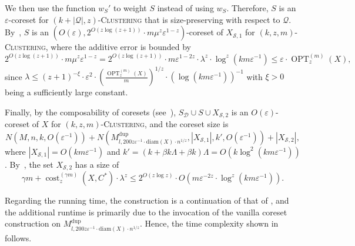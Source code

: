 \documentclass[letterpaper,11pt]{article}
\theoremstyle{plain}
\theoremstyle{definition}
\theoremstyle{remark}
\DeclareMathOperator{\cost}{cost}
\DeclareMathOperator{\OPT}{OPT}
\newcommand{\diam}{\mathrm{diam}}
\newcommand{\dup}{\mathrm{dup}}
\newcommand{\eps}{\varepsilon}
\newcommand{\calD}{\mathcal{D}}
\newcommand{\calQ}{\mathcal{Q}}
\newcommand{\calS}{\mathcal{S}}
\newcommand{\ProblemName}[1]{\textsc{#1}}
\newcommand{\tzC}[1]{\ProblemName{$(#1,z)$-Clustering}\xspace}
\newcommand{\kzmC}{\ProblemName{$(k,z,m)$-Clustering}\xspace}
\begin{document}
We then use the function $w_S'$ to weight $S$ instead of using $w_S$. Therefore, $S$ is an $\eps$-coreset for \tzC{k+|\calQ|} that is size-preserving with respect to $\calQ$.
By~, $S$ is an $\left(O(\eps), 2^{O(z\log (z+1))}\cdot m\mu^z\eps^{1-z}\right)$-coreset of $X_{\calS,1}$ for \kzmC, where the additive error is bounded by 
\begin{equation*}
    2^{O(z\log (z+1))}\cdot m\mu^z\eps^{1-z} = 2^{O(z\log(z+1))}\cdot m\eps^{1-2z}\cdot
    \lambda^z\cdot \log^z(km\eps^{-1})\le \eps\cdot \OPT_z^{(m)}(X),
\end{equation*}
since $\lambda \le (z+1)^{-\xi}\cdot \eps^{2}\cdot \left(\frac{ \OPT_z^{(m)}(X)}{m} \right)^{1/z}\cdot \left(\log(km\eps^{-1})\right)^{-1}$ with $\xi > 0$ being a sufficiently large constant.

Finally, by the composability of coresets (see~), $S_{\calD}\cup S\cup X_{\calS,2}$ is an $O(\eps)$-coreset of $X$ for \kzmC, and the coreset size is 
\begin{equation*}
    N(M,n,k,O(\eps^{-1})) + N\left(M^\dup_{l,200z\eps^{-1}\cdot \diam(X)\cdot n^{1/z}}, |X_{\calS,1}|, k', O(\eps^{-1})\right) + |X_{\calS,2}|,
\end{equation*}
where $|X_{\calS,1}| = O(km\eps^{-1})$ and $k'=(k+\beta k\Lambda + \beta k)\Lambda = O(k\log^2(km\eps^{-1}))$.
By~, the set $X_{\calS,2}$ has a size of 
\begin{equation*}
    \gamma m + \cost_z^{(\gamma m)}(X,C^*)\cdot \lambda^z\le 2^{O(z\log z)}\cdot O\left(m \eps^{-2z}\cdot \log^z(km\eps^{-1})\right).
\end{equation*}

Regarding the running time, the construction is a continuation of that of , and the additional runtime is primarily due to the invocation of the vanilla coreset construction on $M^\dup_{l,200z\eps^{-1}\cdot \text{diam}(X)\cdot n^{1/z}}$. Hence, the time complexity shown in  follows.
\end{document}
